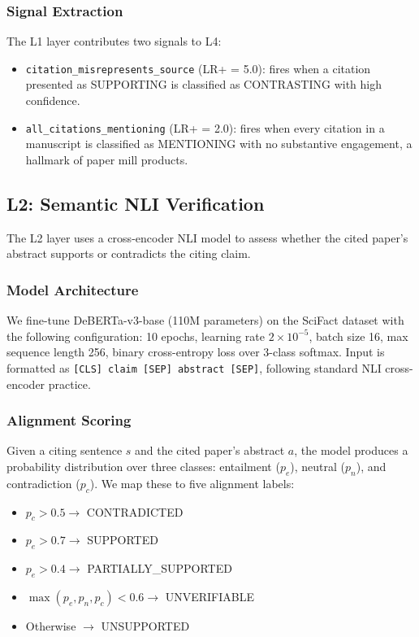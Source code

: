 \documentclass[sigconf,nonacm]{acmart}
\begin{document}
\subsubsection{Signal Extraction}

The L1 layer contributes two signals to L4:
\begin{itemize}[leftmargin=*]
    \item \texttt{citation\_misrepresents\_source} (LR+ = 5.0): fires when a citation presented as SUPPORTING is classified as CONTRASTING with high confidence.
    \item \texttt{all\_citations\_mentioning} (LR+ = 2.0): fires when every citation in a manuscript is classified as MENTIONING with no substantive engagement, a hallmark of paper mill products.
\end{itemize}

\subsection{L2: Semantic NLI Verification}
\label{sec:l2}

The L2 layer uses a cross-encoder NLI model to assess whether the cited paper's abstract supports or contradicts the citing claim.

\subsubsection{Model Architecture}

We fine-tune DeBERTa-v3-base (110M parameters) on the SciFact dataset \cite{wadden2020fact} with the following configuration: 10 epochs, learning rate $2 \times 10^{-5}$, batch size 16, max sequence length 256, binary cross-entropy loss over 3-class softmax.
Input is formatted as \texttt{[CLS] claim [SEP] abstract [SEP]}, following standard NLI cross-encoder practice.

\subsubsection{Alignment Scoring}

Given a citing sentence $s$ and the cited paper's abstract $a$, the model produces a probability distribution over three classes: entailment ($p_e$), neutral ($p_n$), and contradiction ($p_c$).
We map these to five alignment labels:

\begin{itemize}[leftmargin=*]
    \item $p_c > 0.5 \rightarrow$ \textsc{CONTRADICTED}
    \item $p_e > 0.7 \rightarrow$ \textsc{SUPPORTED}
    \item $p_e > 0.4 \rightarrow$ \textsc{PARTIALLY\_SUPPORTED}
    \item $\max(p_e, p_n, p_c) < 0.6 \rightarrow$ \textsc{UNVERIFIABLE}
    \item Otherwise $\rightarrow$ \textsc{UNSUPPORTED}
\end{itemize}
\end{document}
